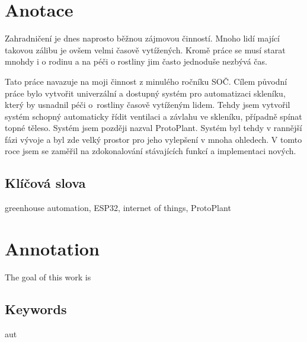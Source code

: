 \documentclass{template/socthesis}
\author{Petr Štourač}
\begin{document}
\maketitle



\pagestyle{empty}

\section*{Anotace}
Zahradničení je dnes naprosto běžnou zájmovou činností. Mnoho lidí mající takovou zálibu je ovšem velmi časově vytížených. Kromě práce se musí starat mnohdy i o rodinu a na péči o rostliny jim často jednoduše nezbývá čas. 

Tato práce navazuje na moji činnost z minulého ročníku SOČ. Cílem původní práce bylo vytvořit univerzální a dostupný systém pro automatizaci skleníku, který by usnadnil péči o~rostliny časově vytíženým lidem. Tehdy jsem vytvořil systém schopný automaticky řídit ventilaci a závlahu ve skleníku, případně spínat topné těleso. Systém jsem později nazval ProtoPlant.
Systém byl tehdy v rannější fázi vývoje a byl zde velký prostor pro jeho vylepšení v mnoha ohledech. V tomto roce jsem se zaměřil na zdokonalování stávajících funkcí a implementaci nových.

\subsection*{Klíčová slova}
greenhouse automation, ESP32, internet of things, ProtoPlant 

\vspace{20mm}

\section*{Annotation}
The goal of this work is

\subsection*{Keywords}
aut

\newpage
\pagestyle{plain}

\tableofcontents %

\setcounter{figure}{0}
\setcounter{table}{0}
\newpage
\end{document}
